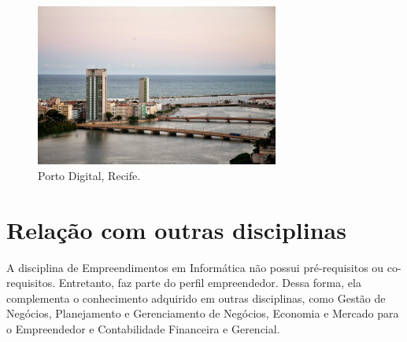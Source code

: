 \documentclass[a4paper, 10pt]{article}
\begin{document}
\begin{figure}[h]
    \centering
    \includegraphics[width=8cm]{portodigital.jpg}
    \caption{Porto Digital, Recife.\cite{portodigital}}

    \label{fig:my_label}
\end{figure}

\section{Relação com outras disciplinas}
A disciplina de Empreendimentos em Informática não possui pré-requisitos ou co-requisitos. Entretanto, faz parte do perfil empreendedor. Dessa forma, ela complementa o conhecimento adquirido em outras disciplinas, como Gestão de Negócios, Planejamento e Gerenciamento de Negócios, Economia e Mercado para o Empreendedor e Contabilidade Financeira e Gerencial. \cite{if781}




\end{document}
